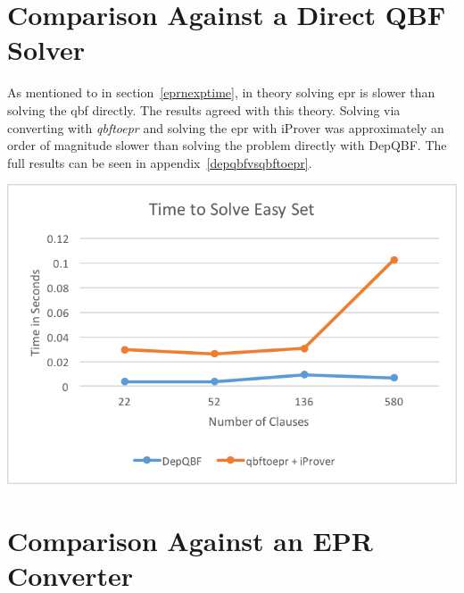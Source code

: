 \section{Comparison Against a Direct QBF Solver}
As mentioned to in section~\ref{eprnexptime}, in theory solving \gls{epr} is slower than solving the \gls{qbf} directly. The results agreed with this theory. Solving via converting with \textit{qbftoepr} and solving the \gls{epr} with iProver was approximately an order of magnitude slower than solving the problem directly with DepQBF. The full results can be seen in appendix~\ref{depqbfvsqbftoepr}. 

\begin{center}
\includegraphics{depqbfvsqbftoepr.png}
\end{center}

\section{Comparison Against an EPR Converter}
